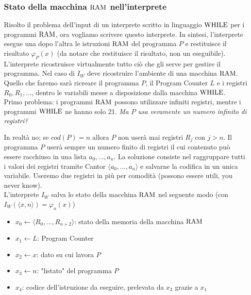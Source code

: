 \subsubsection{Stato della macchina $\text{RAM}$ nell'interprete}

Risolto il problema dell'input di un interprete scritto in linguaggio $\text{WHILE}$ per i programmi $\text{RAM}$, ora vogliamo scrivere questo interprete. In sintesi, l'interprete esegue una dopo l'altra le istruzioni $\text{RAM}$ del programma $P$ e restituisce il risultato $\varphi_P (x)$ (da notare che restituisce il risultato, non un eseguibile).\\

L'interprete ricostruisce virtualmente tutto ciò che gli serve per gestire il programma. Nel caso di $I_W$ deve ricostruire l'ambiente di una macchina $\text{RAM}$. Quello che faremo sarà ricreare il programma $P$, il Program Counter $L$ e i registri $R_0, R_1, \dots$, dentro le variabili messe a disposizione dalla macchina $\text{WHILE}$.\\

Primo problema: i programmi $\text{RAM}$ possono utilizzare infiniti registri, mentre i programmi $\text{WHILE}$ ne hanno solo 21. \textit{Ma $P$ usa veramente un numero infinito di registri?}

In realtà no; se $cod(P) = n$ allora $P$ non userà mai registri $R_j$ con $j > n$. Il programma $P$ userà sempre un numero finito di registri il cui contenuto può essere racchiuso in una lista $a_0, \dots, a_n$. La soluzione consiste nel raggruppare tutti i valori dei registri tramite Cantor $\langle a_0, \dots, a_n \rangle$ e salvarne la codifica in un unica variabile. Useremo due registri in più per comodità (possono essere utili, you never know).\\

L'interprete $I_W$ salva lo stato della macchina $\text{RAM}$ nel seguente modo (con $I_W (\langle x,n\rangle) = \varphi_n (x)$)
\begin{itemize}
	\item $x_0 \leftarrow \langle R_0, \dots, R_{n+2} \rangle$: stato della memoria della macchina $\text{RAM}$
	\item $x_1 \leftarrow L$: Program Counter
	\item $x_2 \leftarrow x$: dato su cui lavora $P$
	\item $x_3 \leftarrow n$: "listato" del programma $P$
	\item $x_4$: codice dell'istruzione da eseguire, prelevata da $x_3$ grazie a $x_1$
\end{itemize}

